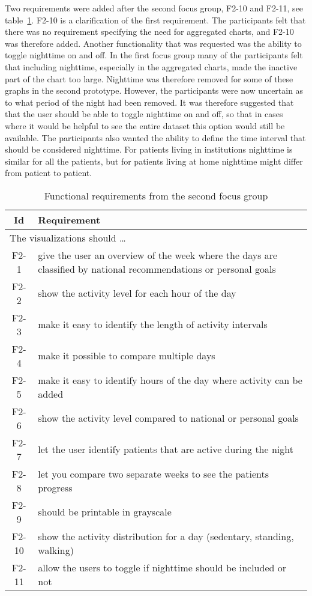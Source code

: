 Two requirements were added after the second focus group, F2-10 and F2-11, see table~\ref{tab:f2Req}. F2-10 is a clarification of the first requirement. The participants felt that there was no requirement specifying the need for aggregated charts, and F2-10 was therefore added. Another functionality that was requested was the ability to toggle nighttime on and off. In the first focus group many of the participants felt that including nighttime, especially in the aggregated charts, made the inactive part of the chart too large. Nighttime was therefore removed for some of these graphs in the second prototype. However, the participants were now uncertain as to what period of the night had been removed. It was therefore suggested that that the user should be able to toggle nighttime on and off, so that in cases where it would be helpful to see the entire dataset this option would still be available. The participants also wanted the ability to define the time interval that should be considered  nighttime. For patients living in institutions nighttime is similar for all the patients, but for patients living at home nighttime might differ from patient to patient.

\begin{table}[h!]
  \begin{center}
  \begin{tabular}{|c|p{12cm}|}
    \hline
      \textbf{Id} & \textbf{Requirement} \\ \hline
    \multicolumn{2}{|l|}{The visualizations should \ldots} \\ \hline
      F2-1 & give the user an overview of the week where the days are classified by national recommendations or personal goals \\ \hline
      F2-2 & show the activity level for each hour of the day \\ \hline
      F2-3 & make it easy to identify the length of activity intervals \\ \hline
      F2-4 & make it possible to compare multiple days \\ \hline
      F2-5 & make it easy to identify hours of the day where activity can be added \\ \hline
      F2-6 & show the activity level compared to national or personal goals \\ \hline
      F2-7 & let the user identify patients that are active during the night \\ \hline
      F2-8 & let you compare two separate weeks to see the patients progress \\ \hline
      F2-9 & should be printable in grayscale \\ \hline
      F2-10 & show the activity distribution for a day (sedentary, standing, walking) \\ \hline
      F2-11 & allow the users to toggle if nighttime should be included or not \\ \hline
  \end{tabular}
  \end{center}
  \caption{Functional requirements from the second focus group}
  \label{tab:f2Req}
\end{table}

